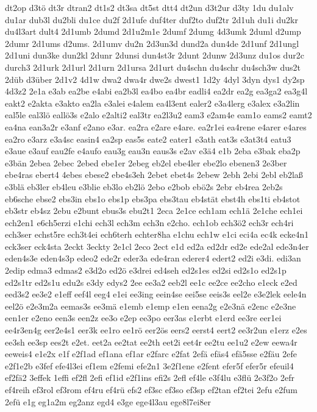 {dt2op
d3tö
dt3r
dtran2
dt1s2
dt3sa
dt5st
dtt4
dt2un
d3t2ur
d3ty
1du
du1alv
du1ar
dub3l
du2bli
du1ce
du2f
2d1ufe
duf4ter
duf2to
duf2tr
2d1uh
du1i
du2kr
du4l3art
dult4
2d1umb
2dumd
2d1u2m1e
2dumf
2dumg
4d3umk
2duml
d2ump
2dumr
2d1ums
d2ums.
2d1umv
du2n
2d3un3d
dund2a
dun4de
2d1unf
2d1ungl
2d1uni
dun3ke
dun2kl
2dunr
2dunsi
dun4st3r
2dunt
2dunw
2d3unz
du1os
dur2c
durch3
2d1urk
2d1url
2d1urn
2d1ursa
2d1urt
du4schn
du4schr
du4sch3w
dus2t
2düb
d3über
2d1v2
4d1w
dwa2
dwa4r
dwe2s
dwest1
1d2y
4dyl
3dyn
dys1
dy2sp
4d3z2
2e1a
e3ab
ea2be
e4abi
ea2b3l
ea4bo
ea4br
eadli4
ea2dr
ea2g
ea3ga2
ea3g4l
eakt2
e2akta
e3akto
ea2la
e3alei
e4alem
ea4l3ent
ealer2
e3a4lerg
e3alex
e3a2lin
eal5le
eal3lö
eallö3s
e2alo
e2alti2
eal3tr
ea2l3u2
eam3
e2am4e
eam1o
eams2
eamt2
ea4na
ean3a2r
e3anf
e2ano
e3ar.
ea2ra
e2are
e4are.
ea2r1ei
ea4rene
e4arer
e4ares
ea2ro
e3arz
e3a4sc
easin4
ea2sp
eas5s
eate2
eater1
e3ath
eat3s
e3at3t4
eatu3
e3aue
e3auf
eau2fe
e4aufo
eau3g
eau3n
eaus3s
e2av
e3ä4
e1b
2eba
e3bak
eba2p
e3bän
2ebea
2ebec
2ebed
ebe1er
2ebeg
eb2el
ebe4ler
ebe2lo
ebenen3
2e3ber
ebe4ras
ebert4
4ebes
ebese2
ebe4s3eh
2ebet
ebet4s
2ebew
2ebh
2ebi
2ebl
eb2laß
e3blä
eb3ler
eb4leu
e3blie
eb3lo
eb2lö
2ebo
e2bob
ebö2s
2ebr
eb4rea
2eb2s
eb6sche
ebse2
ebs3in
ebs1o
ebs1p
ebs3pa
ebs3tau
eb4stät
ebst4h
ebs1ti
eb4stot
eb3str
eb4sz
2ebu
e2bunt
ebus3s
ebu2t1
2eca
2e1ce
ech1am
ech1ä
2e1che
ech1ei
ech2en1
e6ch5erzi
e1chi
ech3l
ech3m
ech3n
e2cho.
ech1ob
ech3ö2
ech3r
ech4ri
ech3ser
echst5re
ech3t4ei
ech6terh
echter8ha
e1chu
ech1w
e1ci
eci4a
ec4k
ecke4n1
eck3ser
eck4sta
2eckt
3eckty
2e1cl
2eco
2ect
e1d
ed2a
ed2dr
ed2e
ede2al
ede3n4er
eden4s3e
eden4s3p
edeo2
ede2r
eder3a
ede4ran
ederer4
edert2
ed2i
e3di.
edi3an
2edip
edma3
edmas2
e3d2o
ed2ö
e3drei
ed4seh
ed2s1es
ed2si
ed2s1o
ed2s1p
ed2s1tr
ed2s1u
edu2s
e3dy
edys2
2ee
ee3a2
eeb2l
ee1c
ee2ce
ee2cho
e1eck
e2ed
eed3s2
ee3e2
e1eff
eef4l
eeg4
e1ei
ee3ing
eein4se
eei5se
eeis3s
eel2e
e3e2lek
eele4n
eel2ö
e2e3m2a
eemas3s
ee3mä
e1emb
e1emp
e1en
eena2g
e2e3nä
e2enc
e2e3ne
een1er
e2eno
een3s
een2z
ee3o
e2ep
ee3po
eer3as
e1erbt
e1erd
ee3re
eer1ei
ee4r3en4g
eer2e4s1
eer3k
ee1ro
ee1rö
eer2ös
eers2
eerst4
eert2
ee3r2un
e1erz
e2es
ee3sh
ee3sp
ees2t
e2et.
eet2a
ee2tat
ee2th
eet2i
eet4r
ee2tu
ee1u2
e2ew
eewa4r
eeweis4
e1e2x
e1f
e2f1ad
ef1ana
ef1ar
e2farc
e2fat
2efä
efäs4
efä5sse
e2fäu
2efe
e2f1e2b
e3fef
efe4l3ei
ef1em
e2femi
efe2n1
3e2f1ene
e2fent
efer5f
efer5r
efeuil4
ef2fä2
3effek
1effi
ef2fl
2efi
ef1id
e2f1ins
efi2s
2efl
ef4le
e3f4lu
e3flü
2e3f2o
2efr
ef4reih
ef3rol
ef3rom
ef4ru
ef4rü
efs2
ef3sc
ef3so
ef3sp
ef2tan
ef2tei
2efu
e2fum
2efü
e1g
eg1a2m
eg2anz
egd4
e3ge
ege4l3au
ege8l7ei8er
}
